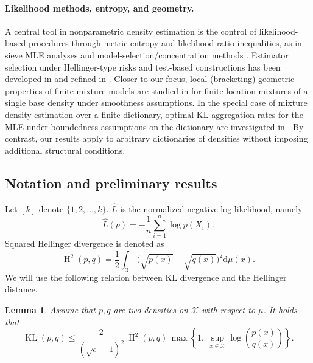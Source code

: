 \documentclass[11pt]{article}
\renewcommand{\le}{\leqslant}
\newcommand{\wh}{\widehat}
\newcommand{\di}{\mathrm{d}}
\newcommand{\X}{\mathcal{X}}
\renewcommand{\triangleq}{=}
\newcommand{\kl}{\operatorname{KL}}
\newcommand{\hel}{\operatorname{H}}
\newcommand{\hels}{\hel^2}
\newtheorem{lemma}{Lemma}
\theoremstyle{definition}
\theoremstyle{remark}
\begin{document}
\paragraph{Likelihood methods, entropy, and geometry.}
A central tool in nonparametric density estimation is the control of likelihood-based procedures through metric entropy and likelihood-ratio inequalities, as in sieve MLE analyses \cite{WongShen1995} and model-selection/concentration methods \cite{massart2007concentration}.
Estimator selection under Hellinger-type risks and test-based constructions has been developed in \cite{baraud2011estimator} and refined in \cite{baraud2017new,baraud2018rho}.
Closer to our focus, local (bracketing) geometric properties of finite mixture models are studied in \cite{gassiat2014local} for finite location mixtures of a single base density under smoothness assumptions.
In the special case of mixture density estimation over a finite dictionary, optimal KL aggregation rates for the MLE under boundedness assumptions on the dictionary are investigated in \cite{li1999mixture,li1999estimation,rakhlin2005risk, Rigollet2012KLAggregation, ButuceaDelmasDutfoyFischer2017Optimal, dalalyan2018optimal}.
By contrast, our results apply to arbitrary dictionaries of densities without imposing additional structural conditions.




\subsection{Notation and preliminary results}
Let $[k]$ denote $\{1, 2, \ldots, k\}$. $\wh L$ is the normalized negative log-likelihood, namely
\begin{equation}
  \label{eq:def-log-likelihood}
  \wh L(p) = -\frac{1}{n}\sum\limits_{i = 1}^n\log p(X_i).
\end{equation}
Squared Hellinger divergence is denoted as
\begin{equation}
  \label{eq:def-hellinger}
  \hels(p,q) \triangleq \frac{1}{2} \int_{\mathcal X} \big(\sqrt{p(x)}-\sqrt{q(x)} \big)^2\di \mu(x).
\end{equation}
We will use the following relation between KL divergence and the Hellinger distance.
\begin{lemma}
    \label{lem:kltohellinger}
Assume that $p,q$ are two densities on $\X$ with respect to $\mu$.
It holds that
\[
\kl(p,q) \le \frac{2}{(\sqrt{e}-1)^2}\,\hels(p,q)\,
\max\left\{1,\ \sup_{x\in\X}\log\left(\frac{p(x)}{q(x)}\right)\right\}.
\]
\end{lemma}
\end{document}
